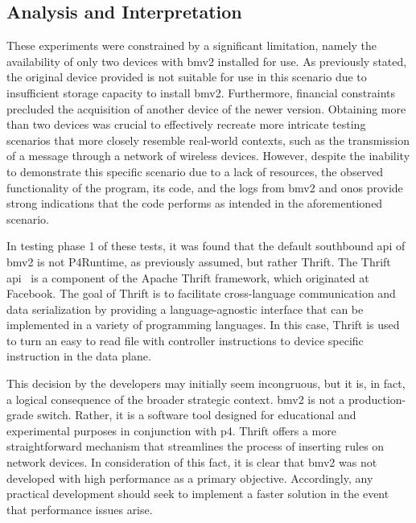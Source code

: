 \subsection{Analysis and Interpretation}

These experiments were constrained by a significant limitation, namely the availability of only two devices with \gls{bmv2} installed for use. As previously stated, the original device provided is not suitable for use in this scenario due to insufficient storage capacity to install \gls{bmv2}. Furthermore, financial constraints precluded the acquisition of another device of the newer version.
Obtaining more than two devices was crucial to effectively recreate more intricate testing scenarios that more closely resemble real-world contexts, such as the transmission of a message through a network of wireless devices. However, despite the inability to demonstrate this specific scenario due to a lack of resources, the observed functionality of the program, its code, and the logs from \gls{bmv2} and \gls{onos} provide strong indications that the code performs as intended in the aforementioned scenario.

In testing phase 1 of these tests, it was found that the default southbound \gls{api} of \gls{bmv2} is not P4Runtime, as previously assumed, but rather Thrift. The Thrift \gls{api}~\cite{noauthor_apache_nodate} is a component of the Apache Thrift framework, which originated at Facebook. The goal of Thrift is to facilitate cross-language communication and data serialization by providing a language-agnostic interface that can be implemented in a variety of programming languages. In this case, Thrift is used to turn an easy to read file with controller instructions to device specific instruction in the data plane.

This decision by the developers may initially seem incongruous, but it is, in fact, a logical consequence of the broader strategic context. \gls{bmv2} is not a production-grade switch. Rather, it is a software tool designed for educational and experimental purposes in conjunction with \gls{p4}. Thrift offers a more straightforward mechanism that streamlines the process of inserting rules on network devices. 
In consideration of this fact, it is clear that \gls{bmv2} was not developed with high performance as a primary objective. Accordingly, any practical development should seek to implement a faster solution in the event that performance issues arise.

